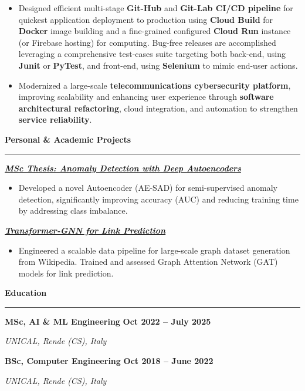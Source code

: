 \documentclass[9pt, a4paper]{article}
\newcommand{\cvsection}[1]{%
	\vspace{2pt}\par
	{\Large\bfseries\color{sectionblue}#1}\par
	\vspace{2pt}\hrule\vspace{6pt}
}
\newcommand{\cvsubsection}[3]{%
	\par {\large\bfseries #1} \hfill {\bfseries #2} \par {\textit{#3}} \vspace{4pt}
}
\newcommand{\cvproject}[1]{%
	\par {{\bfseries{\textit{#1}}}} \par \vspace{4pt}
}
\begin{document}
\begin{minipage}[t]{0.65\linewidth}
\begin{itemize}[leftmargin=*, nosep]
			\vspace{5pt}
			\item \footnotesize Designed efficient multi-stage \textbf{Git-Hub} and \textbf{Git-Lab CI/CD pipeline} for quickest application deployment to production using \textbf{Cloud Build} for \textbf{Docker} image building and a fine-grained configured \textbf{Cloud Run} instance (or Firebase hosting) for computing. Bug-free releases are accomplished leveraging a comprehensive test-cases suite targeting both back-end, using \textbf{Junit} or \textbf{PyTest}, and front-end, using \textbf{Selenium} to mimic end-user actions.       
			
			\vspace{5pt}
			\item \footnotesize Modernized a large-scale \textbf{telecommunications cybersecurity platform}, improving scalability and enhancing user experience through \textbf{software architectural refactoring}, cloud integration, and automation to strengthen \textbf{service reliability}. 
		\end{itemize}
		
		\vspace{10pt}\par
		\cvsection{Personal \& Academic Projects}
		
		\cvproject{\href{https://github.com/bGuzzo/msc-ai-ml-thesis-anomaly-detection}{MSc Thesis: Anomaly Detection with Deep Autoencoders}}
		\begin{itemize}[leftmargin=*, nosep]
			\item \footnotesize Developed a novel Autoencoder (AE-SAD) for semi-supervised anomaly detection, significantly improving accuracy (AUC) and reducing training time by addressing class imbalance.
		\end{itemize}
		
		\vspace{5pt}
		\cvproject{\href{https://github.com/bGuzzo/transformer-gnn-link-prediction}{Transformer-GNN for Link Prediction}}
		\begin{itemize}[leftmargin=*, nosep]
			\item \footnotesize Engineered a scalable data pipeline for large-scale graph dataset generation from Wikipedia. Trained and assessed Graph Attention Network (GAT) models for link prediction.
		\end{itemize}
		
		\vspace{10pt}\par
		\cvsection{Education}
		
		\cvsubsection{MSc, AI \& ML Engineering}{Oct 2022 -- July 2025}{UNICAL, Rende (CS), Italy}
		\cvsubsection{BSc, Computer Engineering}{Oct 2018 -- June 2022}{UNICAL, Rende (CS), Italy}
		
	\end{minipage}%
\end{document}
